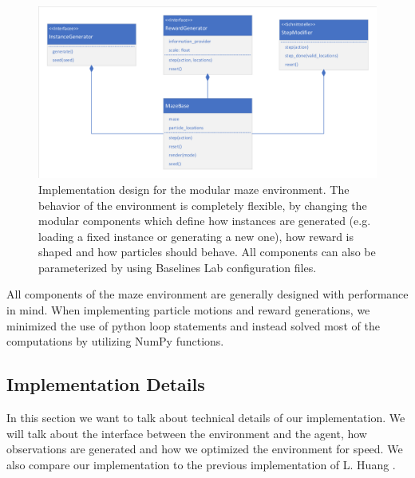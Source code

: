 \begin{figure}[ht]
    
    \begin{center}
        \includegraphics[clip, trim=10px 10px 10px 10px, width=0.9\columnwidth]{figures/implementation/maze_base_design.pdf}
    \end{center}
    
    \caption[Implementation Design for the Maze Environment]{Implementation design for the modular maze environment. The behavior of the environment is completely flexible, by changing the modular components which define how instances are generated (e.g. loading a fixed instance or generating a new one), how reward is shaped and how particles should behave. All components can also be parameterized by using Baselines Lab configuration files.}
    \label{fig:MazeBaseDesign}
  \end{figure}

All components of the maze environment are generally designed with performance in mind. When implementing particle motions and reward generations, we minimized the use of python loop statements and instead solved most of the computations by utilizing NumPy \cite{oliphant2006guide} functions.

\subsection{Implementation Details} \label{sec:MazeImplementationDetails}
In this section we want to talk about technical details of our implementation. We will talk about the interface between the environment and the agent, how observations are generated and how we optimized the environment for speed. We also compare our implementation to the previous implementation of L. Huang \cite{huangMazeGithub}.

